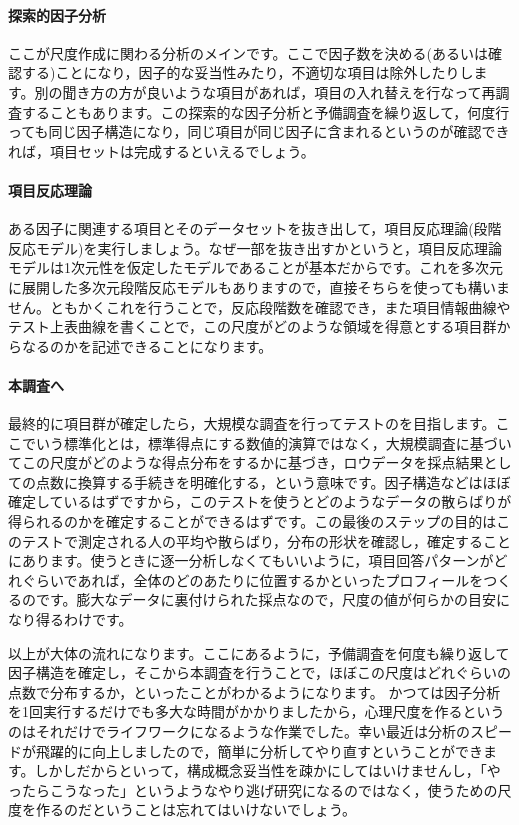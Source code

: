 \documentclass{ltjsbook}
\begin{document}
\paragraph{探索的因子分析}ここが尺度作成に関わる分析のメインです。ここで因子数を決める(あるいは確認する)ことになり，因子的な妥当性みたり，不適切な項目は除外したりします。別の聞き方の方が良いような項目があれば，項目の入れ替えを行なって再調査することもあります。この探索的な因子分析と予備調査を繰り返して，何度行っても同じ因子構造になり，同じ項目が同じ因子に含まれるというのが確認できれば，項目セットは完成するといえるでしょう。

\paragraph{項目反応理論}ある因子に関連する項目とそのデータセットを抜き出して，項目反応理論(段階反応モデル)を実行しましょう。なぜ一部を抜き出すかというと，項目反応理論モデルは1次元性を仮定したモデルであることが基本だからです。これを多次元に展開した多次元段階反応モデルもありますので，直接そちらを使っても構いません。ともかくこれを行うことで，反応段階数を確認でき，また項目情報曲線やテスト上表曲線を書くことで，この尺度がどのような領域を得意とする項目群からなるのかを記述できることになります。

\paragraph{本調査へ}最終的に項目群が確定したら，大規模な調査を行ってテストのを目指します。ここでいう標準化とは，標準得点にする数値的演算ではなく，大規模調査に基づいてこの尺度がどのような得点分布をするかに基づき，ロウデータを採点結果としての点数に換算する手続きを明確化する，という意味です。因子構造などはほぼ確定しているはずですから，このテストを使うとどのようなデータの散らばりが得られるのかを確定することができるはずです。この最後のステップの目的はこのテストで測定される人の平均や散らばり，分布の形状を確認し，確定することにあります。使うときに逐一分析しなくてもいいように，項目回答パターンがどれぐらいであれば，全体のどのあたりに位置するかといったプロフィールをつくるのです。膨大なデータに裏付けられた採点なので，尺度の値が何らかの目安になり得るわけです。

以上が大体の流れになります。ここにあるように，予備調査を何度も繰り返して因子構造を確定し，そこから本調査を行うことで，ほぼこの尺度はどれぐらいの点数で分布するか，といったことがわかるようになります。
かつては因子分析を1回実行するだけでも多大な時間がかかりましたから，心理尺度を作るというのはそれだけでライフワークになるような作業でした。幸い最近は分析のスピードが飛躍的に向上しましたので，簡単に分析してやり直すということができます。しかしだからといって，構成概念妥当性を疎かにしてはいけませんし，「やったらこうなった」というようなやり逃げ研究になるのではなく，使うための尺度を作るのだということは忘れてはいけないでしょう。
\end{document}
